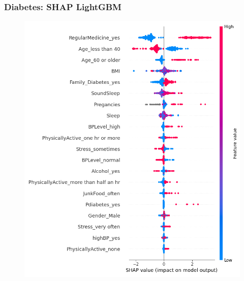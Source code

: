 \documentclass{beamer}
\begin{document}
\begin{frame}
\frametitle{Diabetes: SHAP LightGBM}
\begin{figure}[H]

 \label{fig:op:dia:lamb:lgbm}
 \centering
 \includegraphics[scale=0.3]{shap_lgbm_diabete.png}
\end{figure}
\end{frame}
\end{document}
